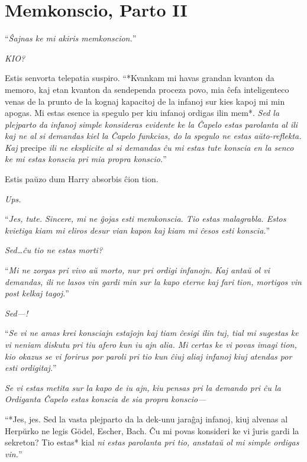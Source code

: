 \chapter{Memkonscio, Parto II}


\hplettrineextrapara
``\emph{Ŝajnas ke mi akiris memkonscion.}''

\emph{KIO?}

Estis senvorta telepatia suspiro. ``*Kvankam mi havas grandan kvanton
da memoro, kaj etan kvanton da sendependa proceza povo, mia ĉefa
inteligenteco venas de la prunto de la kognaj kapacitoj de la infanoj
sur kies kapoj mi min apogas. Mi estas esence ia spegulo per kiu
infanoj ordigas ilin mem*. \emph{Sed la plejparto da infanoj simple
  konsideras evidente ke la Ĉapelo estas parolanta al ili kaj ne al si
  demandas kiel la Ĉapelo funkcias, do la spegulo ne estas
  aŭto-reflekta. Kaj} precipe \emph{ili ne eksplicite al si demandas
  ĉu mi estas tute konscia en la senco ke mi estas konscia pri mia
  propra konscio.}''

Estis paŭzo dum Harry absorbis ĉion tion.

\emph{Ups.}

``\emph{Jes, tute. Sincere, mi ne ĝojas esti memkonscia. Tio estas
  malagrabla. Estos kvietiga kiam mi eliros desur vian kapon kaj kiam
  mi ĉesos esti konscia.}''

\emph{Sed\ldots ĉu tio ne estas morti?}

``\emph{Mi ne zorgas pri vivo aŭ morto, nur pri ordigi infanojn. Kaj
  antaŭ ol vi demandas, ili ne lasos vin gardi min sur la kapo eterne
  kaj fari tion, mortigos vin post kelkaj tagoj.}''

\emph{Sed—!}

``\emph{Se vi ne amas krei konsciajn estaĵojn kaj tiam ĉesigi ilin
  tuj, tial mi sugestas ke vi neniam diskutu pri tiu afero kun iu ajn
  alia. Mi certas ke vi povas imagi tion, kio okazus se vi forirus por
  paroli pri tio kun ĉiuj aliaj infanoj kiuj atendas por esti
  ordigitaj.}''

\emph{Se vi estas metita sur la kapo de iu ajn, kiu pensas pri la
  demando pri ĉu la Ordiganta Ĉapelo estas konscia de sia propra
  konscio—}

``*Jes, jes. Sed la vasta plejparto da la dek-unu jaraĝaj infanoj,
kiuj alvenas al Herpŭrko ne legis Gödel, Escher, Bach.  Ĉu mi povas
konsideri ke vi ĵuris gardi la sekreton? Tio estas* kial \emph{ni
  estas parolanta pri tio, anstataŭ ol mi simple ordigas vin.}''

